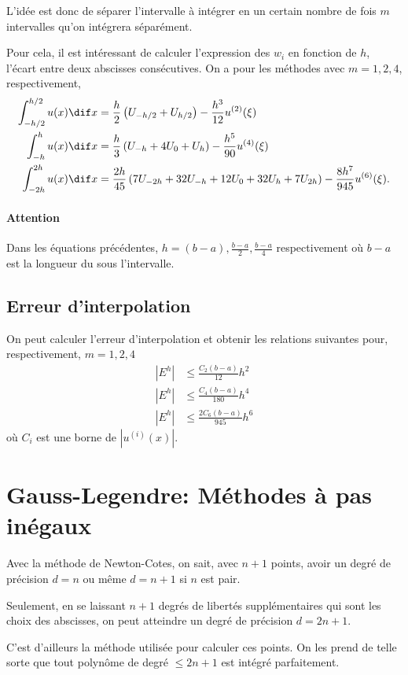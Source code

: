 L'idée est donc de séparer l'intervalle à intégrer en un certain nombre
de fois $m$ intervalles qu'on intégrera séparément.

Pour cela, il est intéressant de calculer l'expression des $w_i$
en fonction de $h$, l'écart entre deux abscisses consécutives.
On a pour les méthodes avec $m = 1, 2, 4$, respectivement,
\begin{align*}
  \int_{-h/2}^{h/2}u(x)\dif x & =
  \frac{h}{2} \left(U_{-h/2} + U_{h/2}\right)
  -\frac{h^3}{12}u^{(2)}(\xi)\\
  \int_{-h}^{h}u(x)\dif x & =
  \frac{h}{3} \left(U_{-h} + 4 U_0 + U_{h}\right)
  -\frac{h^5}{90}u^{(4)}(\xi)\\
  \int_{-2h}^{2h}u(x)\dif x & =
  \frac{2h}{45}
  \left(7U_{-2h} + 32U_{-h} +12U_0 + 32U_{h} + 7U_{2h}\right)
  -\frac{8h^7}{945}u^{(6)}(\xi).
\end{align*}
\paragraph{Attention}
Dans les équations précédentes, $h = (b-a), \frac{b-a}{2}, \frac{b-a}{4}$
respectivement où $b-a$ est la longueur du sous l'intervalle.

\subsection{Erreur d'interpolation}
On peut calculer l'erreur d'interpolation et obtenir les relations suivantes
pour, respectivement, $m = 1, 2, 4$
\begin{align*}
  |E^h| & \leq \frac{C_2(b-a)}{12}h^2\\
  |E^h| & \leq \frac{C_4(b-a)}{180}h^4\\
  |E^h| & \leq \frac{2C_6(b-a)}{945}h^6
\end{align*}
où $C_i$ est une borne de $|u^{(i)}(x)|$.

\section{Gauss-Legendre: Méthodes à pas inégaux}
Avec la méthode de Newton-Cotes, on sait, avec $n+1$ points, avoir
un degré de précision $d = n$ ou même $d = n+1$ si $n$ est pair.

Seulement, en se laissant $n+1$ degrés de libertés supplémentaires
qui sont les choix des abscisses, on peut atteindre
un degré de précision $d = 2n+1$.

C'est d'ailleurs la méthode utilisée pour calculer ces points.
On les prend de telle sorte que tout polynôme de degré $\leq 2n+1$ est
intégré parfaitement.

